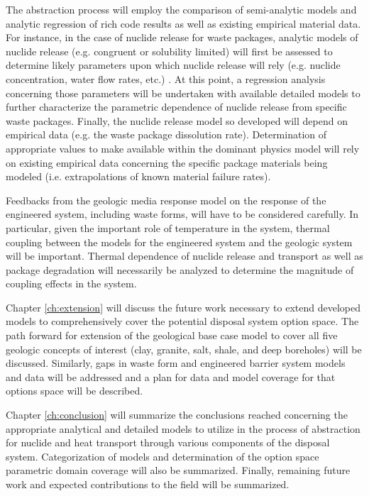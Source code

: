 The abstraction process will employ the comparison of semi-analytic models and
analytic regression of rich code results as well as existing empirical material
data. For instance, in the case of nuclide release for waste packages, analytic
models of nuclide release (e.g. congruent or solubility limited) will first be
assessed to determine likely parameters upon which nuclide release will rely
(e.g. nuclide concentration, water flow rates, etc.) \cite{ahn_congruent}. At
this point, a regression analysis concerning those parameters will be
undertaken with available detailed models to further characterize the
parametric dependence of nuclide release from specific waste packages.
Finally, the nuclide release model so developed will depend on empirical data
(e.g. the waste package dissolution rate). Determination of appropriate values
to make available within the dominant physics model will rely on existing
empirical data concerning the specific package materials being modeled (i.e.
extrapolations of known material failure rates).  

Feedbacks from the geologic media response model on the response of the
engineered system, including waste forms, will have to be considered carefully.
In particular, given the important role of temperature in the system, thermal
coupling between the models for the engineered system and the geologic system
will be important. Thermal dependence of nuclide release and transport as well
as package degradation will necessarily be analyzed to determine the magnitude
of coupling effects in the system.

Chapter \ref{ch:extension} will discuss the future work necessary to extend
developed models to comprehensively cover the potential disposal system option
space. The path forward for extension of the geological base case model to
cover all five geologic concepts of interest (clay, granite, salt, shale, and
deep boreholes) will be discussed. Similarly, gaps in waste form and engineered
barrier system models and data will be addressed and a plan for data and model
coverage for that options space will be described.

Chapter \ref{ch:conclusion} will summarize the conclusions reached concerning
the appropriate analytical and detailed models to utilize in the process of
abstraction for nuclide and heat transport through various components of the
disposal system. Categorization of models and determination of the option space
parametric domain coverage will also be summarized. Finally, remaining future
work and expected contributions to the field will be summarized. 
